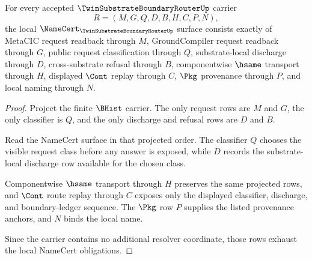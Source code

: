 \begin{theorem}
\label{thm:twin-substrate-boundary-router-namecert-obligations}
For every accepted $\TwinSubstrateBoundaryRouterUp$ carrier
$$
R=(M,G,Q,D,B,H,C,P,N),
$$
the local $\NameCert_{\TwinSubstrateBoundaryRouterUp}$ surface consists exactly of MetaCIC request readback through $M$, GroundCompiler request readback through $G$, public request classification through $Q$, substrate-local discharge through $D$, cross-substrate refusal through $B$, componentwise $\hsame$ transport through $H$, displayed $\Cont$ replay through $C$, $\Pkg$ provenance through $P$, and local naming through $N$.
\end{theorem}
\begin{proof}
Project the finite $\BHist$ carrier. The only request rows are $M$ and $G$, the only classifier is $Q$, and the only discharge and refusal rows are $D$ and $B$.

Read the NameCert surface in that projected order. The classifier $Q$ chooses the visible request class before any answer is exposed, while $D$ records the substrate-local discharge row available for the chosen class.

Componentwise $\hsame$ transport through $H$ preserves the same projected rows, and $\Cont$ route replay through $C$ exposes only the displayed classifier, discharge, and boundary-ledger sequence. The $\Pkg$ row $P$ supplies the listed provenance anchors, and $N$ binds the local name.

Since the carrier contains no additional resolver coordinate, those rows exhaust the local NameCert obligations.
\end{proof}

